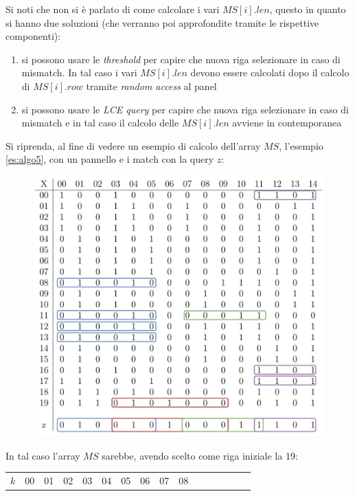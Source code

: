 Si noti che non si è parlato di come calcolare i vari $MS[i].len$, questo in
quanto si hanno due soluzioni (che verranno poi approfondite tramite le
rispettive componenti):
\begin{enumerate}
  \item si possono usare le \textit{threshold} per capire che nuova riga
  selezionare in 
  caso di mismatch. In tal caso i vari $MS[i].len$ devono essere calcolati dopo
  il calcolo di $MS[i].row$ tramite \textit{random access} al panel
  \item si possono usare le \textit{LCE query} per capire che nuova riga
  selezionare in caso di mismatch e in tal caso il calcolo delle $MS[i].len$
  avviene in contemporanea 
\end{enumerate}
\begin{esempio}
  \label{es:ms}
  Si riprenda, al fine di vedere un esempio di calcolo dell'array $MS$,
  l'esempio \ref{es:algo5}, con un pannello e i match con 
  la query $z$:
  \begin{figure}[H]
    \centering
    \includegraphics[scale = 0.365]{img/pbwtmatch.pdf}
  \end{figure}
  In tal caso l'array $MS$ sarebbe, avendo scelto come riga iniziale la 19:
  \begin{table}[H]
    \footnotesize{}
    \centering
    \begin{tabular}{c|ccccccccccccccc}
      $k$ & 00 & 01 & 02 & 03 & 04 &  {\color{nordgreen}05} & 06 & 07 & 08

\end{tabular}
\end{table}
\end{esempio}
